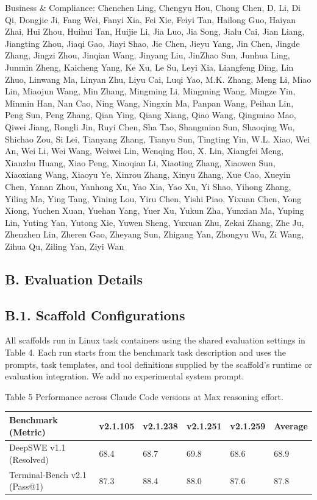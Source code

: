 \documentclass[
  10
]{article}
\newcounter{none} %
\begin{document}
Business \& Compliance: Chenchen Ling, Chengyu Hou, Chong Chen, D. Li,
Di Qi, Dongjie Ji, Fang Wei, Fanyi Xia, Fei Xie, Feiyi Tan, Hailong Guo,
Haiyan Zhai, Hui Zhou, Huihui Tan, Huijie Li, Jia Luo, Jia Song, Jialu
Cai, Jian Liang, Jiangting Zhou, Jiaqi Gao, Jiayi Shao, Jie Chen, Jieyu
Yang, Jin Chen, Jingde Zhang, Jingzi Zhou, Jinqian Wang, Jinyang Liu,
JinZhao Sun, Junhua Ling, Junmin Zheng, Kaicheng Yang, Ke Xu, Le Su,
Leyi Xia, Liangfeng Ding, Lin Zhuo, Linwang Ma, Linyan Zhu, Liyu Cai,
Luqi Yao, M.K. Zhang, Meng Li, Miao Lin, Miaojun Wang, Min Zhang,
Mingming Li, Mingming Wang, Mingze Yin, Minmin Han, Nan Cao, Ning Wang,
Ningxin Ma, Panpan Wang, Peihan Lin, Peng Sun, Peng Zhang, Qian Ying,
Qiang Xiang, Qiao Wang, Qingmiao Mao, Qiwei Jiang, Rongli Jin, Ruyi
Chen, Sha Tao, Shangmian Sun, Shaoqing Wu, Shichao Zou, Si Lei, Tianyang
Zhang, Tianyu Sun, Tingting Yin, W.L. Xiao, Wei An, Wei Li, Wei Wang,
Weiwei Lin, Wenqing Hou, X. Lin, Xiangfei Meng, Xianzhu Huang, Xiao
Peng, Xiaoqian Li, Xiaoting Zhang, Xiaowen Sun, Xiaoxiang Wang, Xiaoyu
Ye, Xinrou Zhang, Xinyu Zhang, Xue Cao, Xueyin Chen, Yanan Zhou, Yanhong
Xu, Yao Xia, Yao Xu, Yi Shao, Yihong Zhang, Yiling Ma, Ying Tang, Yining
Lou, Yiru Chen, Yishi Piao, Yixuan Chen, Yong Xiong, Yuchen Xuan, Yuehan
Yang, Yuer Xu, Yukun Zha, Yunxian Ma, Yuping Lin, Yuting Yan, Yutong
Xie, Yuwen Sheng, Yuxuan Zhu, Zekai Zhang, Zhe Ju, Zhenzhen Lin, Zheren
Gao, Zheyang Sun, Zhigang Yan, Zhongyu Wu, Zi Wang, Zihua Qu, Ziling
Yan, Ziyi Wan

\subsection{B. Evaluation Details}\label{b.-evaluation-details}

\subsection{B.1. Scaffold
Configurations}\label{b.1.-scaffold-configurations}

All scaffolds run in Linux task containers using the shared evaluation
settings in Table 4. Each run starts from the benchmark task description
and uses the prompts, task templates, and tool definitions supplied by
the scaffold's runtime or evaluation integration. We add no experimental
system prompt.

Table 5 \textbar{} Performance across Claude Code versions at Max
reasoning effort.

{\def\LTcaptype{none} %
\begin{longtable}[]{@{}|l|l|l|l|l|l|@{}}
\toprule\noalign{}
\endhead
\bottomrule\noalign{}
\endlastfoot
\hline
Benchmark (Metric) & v2.1.105 & v2.1.238 & v2.1.251 & v2.1.259 &
Average \\
\hline
DeepSWE v1.1 (Resolved) & 68.4 & 68.7 & 69.8 & 68.6 & 68.9 \\
\hline
Terminal-Bench v2.1 (Pass@1) & 87.3 & 88.4 & 88.0 & 87.6 & 87.8 \\
\hline
\end{longtable}
}
\end{document}
